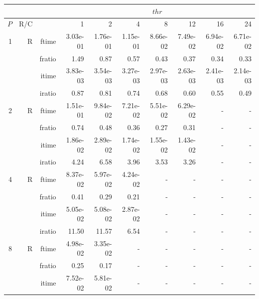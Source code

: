 \documentclass[a4paper]{article}
\begin{document}
\begin{table}[htbp]
\begin{center}
\begin{small}
\begin{tabular}{|r|r|r|r|r|r|r|r|r|r|}
\hline 
     & & & \multicolumn{7}{c|}{$thr$} \\ \hline
    $P$ & R/C &  & 1           & 2    & 4    & 8    & 12   & 16    & 24  \\ \hline\hline
     1 & R & ftime & 3.03e-01 & 1.76e-01 & 1.15e-01 & 8.66e-02 & 7.49e-02 & 6.94e-02 & 6.71e-02 \\   
          &      & fratio & 1.49 & 0.87 & 0.57 & 0.43 & 0.37 & 0.34 & 0.33 \\   
          &      & itime & 3.83e-03 & 3.54e-03 & 3.27e-03 & 2.97e-03 & 2.63e-03 & 2.41e-03 & 2.14e-03 \\   
          &      & iratio & 0.87 & 0.81 & 0.74 & 0.68 & 0.60 & 0.55 & 0.49 \\ \hline 
     2 & R & ftime & 1.51e-01 & 9.84e-02 & 7.21e-02 & 5.51e-02 & 6.29e-02 &     -     &     -     \\   
          &      & fratio & 0.74 & 0.48 & 0.36 & 0.27 & 0.31 &     -     &     -     \\   
          &      & itime & 1.86e-02 & 2.89e-02 & 1.74e-02 & 1.55e-02 & 1.43e-02 &     -     &     -     \\   
          &      & iratio & 4.24 & 6.58 & 3.96 & 3.53 & 3.26 &     -     &     -     \\ \hline 
     4 & R & ftime & 8.37e-02 & 5.97e-02 & 4.24e-02 &     -     &     -     &     -     &     -     \\   
          &      & fratio & 0.41 & 0.29 & 0.21 &     -     &     -     &     -     &     -     \\   
          &      & itime & 5.05e-02 & 5.08e-02 & 2.87e-02 &     -     &     -     &     -     &     -     \\   
          &      & iratio & 11.50 & 11.57 & 6.54 &     -     &     -     &     -     &     -     \\ \hline 
     8 & R & ftime & 4.98e-02 & 3.35e-02 &     -     &     -     &     -     &     -     &     -     \\   
          &      & fratio & 0.25 & 0.17 &     -     &     -     &     -     &     -     &     -     \\   
          &      & itime & 7.52e-02 & 5.81e-02 &     -     &     -     &     -     &     -     &     -     \\   

\end{tabular}
\end{small}
\end{center}
\end{table}
\end{document}

